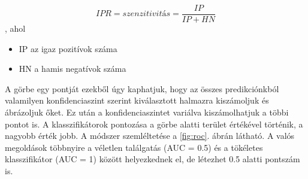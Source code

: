 \begin{equation}
    IPR = szenzitivitás = \frac{IP}{IP + HN}
\end{equation},
ahol
\begin{itemize}
    \item IP az igaz pozitívok száma
    \item HN a hamis negatívok száma
\end{itemize}
A görbe egy pontját ezekből úgy kaphatjuk, hogy az összes predikciónkból valamilyen konfidenciaszint szerint kiválasztott halmazra kiszámoljuk és ábrázoljuk őket. Ez után a konfidenciaszintet variálva kiszámolhatjuk a többi pontot is. A klasszifikátorok pontozása a görbe alatti terület értékével történik, a nagyobb érték jobb. A módszer szemléltetése a \ref{fig:roc}. ábrán látható. A valós megoldások többnyire a véletlen találgatás (AUC = 0.5) és a tökéletes klasszifikátor (AUC = 1) között helyezkednek el, de létezhet 0.5 alatti pontszám is.

